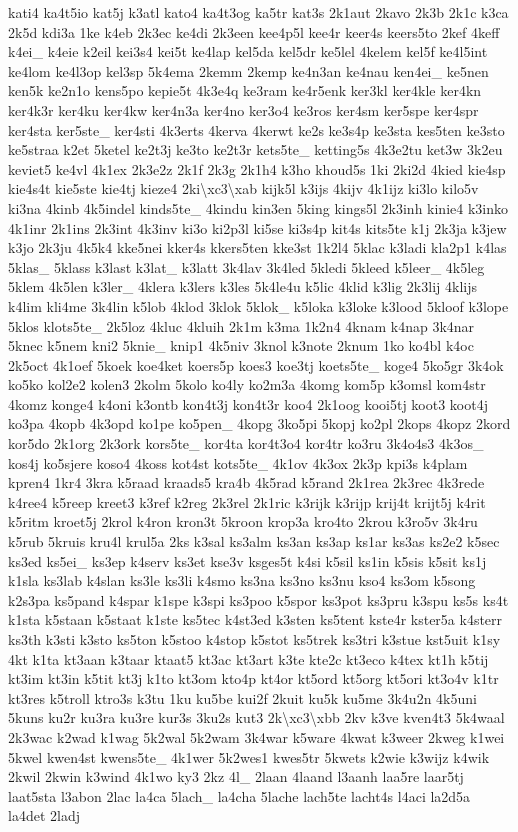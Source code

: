 {kati4 ka4t5io kat5j k3atl kato4 ka4t3og ka5tr kat3s 2k1aut 2kavo 2k3b 2k1c k3ca 2k5d kdi3a 1ke k4eb 2k3ec ke4di 2k3een kee4p5l kee4r keer4s keers5to 2kef 4keff k4ei\-\_\- k4eie k2eil kei3s4 kei5t ke4lap kel5da kel5dr ke5lel 4kelem kel5f ke4l5int ke4lom ke4l3op kel3sp 5k4ema 2kemm 2kemp ke4n3an ke4nau ken4ei\-\_\- ke5nen ken5k ke2n1o kens5po kepie5t 4k3e4q ke3ram ke4r5enk ker3kl ker4kle ker4kn ker4k3r ker4ku ker4kw ker4n3a ker4no ker3o4 ke3ros ker4sm ker5spe ker4spr ker4sta ker5ste\-\_\- ker4sti 4k3erts 4kerva 4kerwt ke2s ke3s4p ke3sta kes5ten ke3sto ke5straa k2et 5ketel ke2t3j ke3to ke2t3r kets5te\-\_\- ketting5s 4k3e2tu ket3w 3k2eu keviet5 ke4vl 4k1ex 2k3e2z 2k1f 2k3g 2k1h4 k3ho khoud5s 1ki 2ki2d 4kied kie4sp kie4s4t kie5ste kie4tj kieze4 2ki\textbackslash{}xc3\textbackslash{}xab kijk5l k3ijs 4kijv 4k1ijz ki3lo kilo5v ki3na 4kinb 4k5indel kinds5te\-\_\- 4kindu kin3en 5king kings5l 2k3inh kinie4 k3inko 4k1inr 2k1ins 2k3int 4k3inv ki3o ki2p3l ki5se ki3s4p kit4s kits5te k1j 2k3ja k3jew k3jo 2k3ju 4k5k4 kke5nei kker4s kkers5ten kke3st 1k2l4 5klac k3ladi kla2p1 k4las 5klas\-\_\- 5klass k3last k3lat\-\_\- k3latt 3k4lav 3k4led 5kledi 5kleed k5leer\-\_\- 4k5leg 5klem 4k5len k3ler\-\_\- 4klera k3lers k3les 5k4le4u k5lic 4klid k3lig 2k3lij 4klijs k4lim kli4me 3k4lin k5lob 4klod 3klok 5klok\-\_\- k5loka k3loke k3lood 5kloof k3lope 5klos klots5te\-\_\- 2k5loz 4kluc 4kluih 2k1m k3ma 1k2n4 4knam k4nap 3k4nar 5knec k5nem kni2 5knie\-\_\- knip1 4k5niv 3knol k3note 2knum 1ko ko4bl k4oc 2k5oct 4k1oef 5koek koe4ket koers5p koes3 koe3tj koets5te\-\_\- koge4 5ko5gr 3k4ok ko5ko kol2e2 kolen3 2kolm 5kolo ko4ly ko2m3a 4komg kom5p k3omsl kom4str 4komz konge4 k4oni k3ontb kon4t3j kon4t3r koo4 2k1oog kooi5tj koot3 koot4j ko3pa 4kopb 4k3opd ko1pe ko5pen\-\_\- 4kopg 3ko5pi 5kopj ko2pl 2kops 4kopz 2kord kor5do 2k1org 2k3ork kors5te\-\_\- kor4ta kor4t3o4 kor4tr ko3ru 3k4o4s3 4k3os\-\_\- kos4j ko5sjere koso4 4koss kot4st kots5te\-\_\- 4k1ov 4k3ox 2k3p kpi3s k4plam kpren4 1kr4 3kra k5raad kraads5 kra4b 4k5rad k5rand 2k1rea 2k3rec 4k3rede k4ree4 k5reep kreet3 k3ref k2reg 2k3rel 2k1ric k3rijk k3rijp krij4t krijt5j k4rit k5ritm kroet5j 2krol k4ron kron3t 5kroon krop3a kro4to 2krou k3ro5v 3k4ru k5rub 5kruis kru4l krul5a 2ks k3sal ks3alm ks3an ks3ap ks1ar ks3as ks2e2 k5sec ks3ed ks5ei\-\_\- ks3ep k4serv ks3et kse3v ksges5t k4si k5sil ks1in k5sis k5sit ks1j k1sla ks3lab k4slan ks3le ks3li k4smo ks3na ks3no ks3nu kso4 ks3om k5song k2s3pa ks5pand k4spar k1spe k3spi ks3poo k5spor ks3pot ks3pru k3spu ks5s ks4t k1sta k5staan k5staat k1ste ks5tec k4st3ed k3sten ks5tent kste4r kster5a k4sterr ks3th k3sti k3sto ks5ton k5stoo k4stop k5stot ks5trek ks3tri k3stue kst5uit k1sy 4kt k1ta kt3aan k3taar ktaat5 kt3ac kt3art k3te kte2c kt3eco k4tex kt1h k5tij kt3im kt3in k5tit kt3j k1to kt3om kto4p kt4or kt5ord kt5org kt5ori kt3o4v k1tr kt3res k5troll ktro3s k3tu 1ku ku5be kui2f 2kuit ku5k ku5me 3k4u2n 4k5uni 5kuns ku2r ku3ra ku3re kur3s 3ku2s kut3 2k\textbackslash{}xc3\textbackslash{}xbb 2kv k3ve kven4t3 5k4waal 2k3wac k2wad k1wag 5k2wal 5k2wam 3k4war k5ware 4kwat k3weer 2kweg k1wei 5kwel kwen4st kwens5te\-\_\- 4k1wer 5k2wes1 kwes5tr 5kwets k2wie k3wijz k4wik 2kwil 2kwin k3wind 4k1wo ky3 2kz 4l\-\_\- 2laan 4laand l3aanh laa5re laar5tj laat5sta l3abon 2lac la4ca 5lach\-\_\- la4cha 5lache lach5te lacht4s l4aci la2d5a la4det 2ladj }
